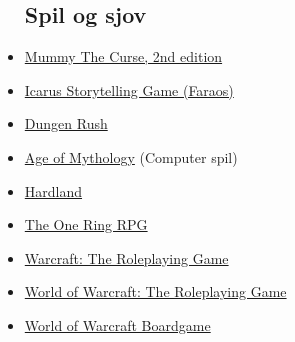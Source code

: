 \begin{itemize}
    \subsection{Spil og sjov}
    \item \href{https://www.kickstarter.com/projects/339646881/mummy-the-curse-2nd-edition}{Mummy The Curse, 2nd edition}
    \item \href{https://www.faraos.dk/games/braetspil/g-h-i/i/i/icarus-a-storytelling-game-about-how-great-civilizations-fall}{Icarus Storytelling Game (Faraos)}
    \item \href{https://boardgamegeek.com/boardgame/207338/dungeon-rush}{Dungen Rush}
    \item \href{https://store.steampowered.com/app/266840/Age_of_Mythology_Extended_Edition/}{Age of Mythology} (Computer spil)
    \item \href{https://store.steampowered.com/app/321980/Hardland/}{Hardland}
    \item \href{https://www.cubicle7games.com/our-games/the-one-ring/}{The One Ring RPG}
    \item \href{https://www.amazon.com/Warcraft-Roleplaying-Game-Arthaus/dp/1588460711}{Warcraft: The Roleplaying Game}
    \item \href{https://www.amazon.co.uk/World-Warcraft-Roleplaying-Game/dp/1588467813?SubscriptionId=AKIAILSHYYTFIVPWUY6Q&tag=duckduckgo-ffab-uk-21&linkCode=xm2&camp=2025&creative=165953&creativeASIN=1588467813}{World of Warcraft: The Roleplaying Game}
    \item \href{https://boardgamegeek.com/boardgame/17223/world-warcraft-boardgame}{World of Warcraft Boardgame}
\end{itemize}